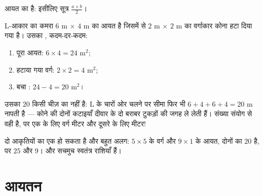 \begin{omfigure}

{\small {} आयत का  है: इसीलिए सूत्र
$\frac{a\times b}{2}$।}
\end{omfigure}

\begin{example}[जोड़-तोड़ वाली आकृतियाँ]\label{ex:g6:measure:composite}
L-आकार का कमरा $6$ m $\times$ $4$ m का आयत है जिसमें से $2$ m
$\times$ $2$ m का वर्गाकार कोना हटा दिया गया है। उसका , कदम-दर-कदम:
\begin{enumerate}
  \item पूरा आयत: $6 \times 4 = 24$ m$^2$;
  \item हटाया गया वर्ग: $2 \times 2 = 4$ m$^2$;
  \item बचा : $24 - 4 = 20$ m$^2$।
\end{enumerate}
उसका \emph{} $20$ किसी चीज़ का नहीं है: L के चारों ओर चलने
पर सीमा फिर भी $6 + 4 + 6 + 4 = 20$ m नापती है --- कोने की दोनों
कटाइयाँ दीवार के दो बराबर टुकड़ों की जगह ले लेती हैं। संख्या
संयोग से वही है, पर एक के लिए वर्ग मीटर और दूसरे के लिए मीटर!
\end{example}

\begin{remark}
दो आकृतियों का  एक हो सकता है और  बहुत अलग:
$5 \times 5$ के वर्ग और $9 \times 1$ के आयत, दोनों का 
$20$ है, पर  $25$ और $9$।  और  सचमुच
स्वतंत्र राशियाँ हैं।
\end{remark}

\section{आयतन}

